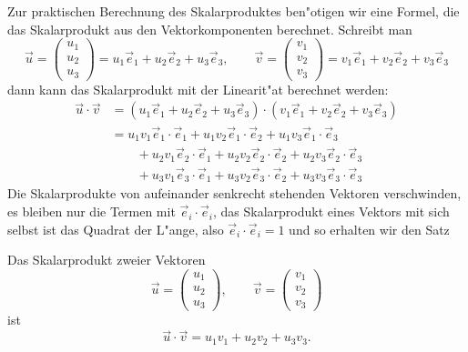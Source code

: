 Zur praktischen Berechnung des Skalarproduktes ben"otigen wir
eine Formel, die das Skalarprodukt aus den Vektorkomponenten 
berechnet. Schreibt man
\[
\vec u=\begin{pmatrix}u_1\\u_2\\u_3\end{pmatrix}
=u_1\vec e_1+u_2\vec e_2+u_3\vec e_3
,
\qquad
\vec v=\begin{pmatrix}v_1\\v_2\\v_3\end{pmatrix}
=v_1\vec e_1+v_2\vec e_2+v_3\vec e_3
\]
dann kann das Skalarprodukt mit der Linearit"at berechnet werden:
\begin{align*}
\vec u\cdot\vec v
&=
(u_1\vec e_1+u_2\vec e_2+u_3\vec e_3)\cdot
(v_1\vec e_1+v_2\vec e_2+v_3\vec e_3)
\\
&=
u_1v_1\vec e_1\cdot\vec e_1+
u_1v_2\vec e_1\cdot\vec e_2+
u_1v_3\vec e_1\cdot\vec e_3\\
&\qquad +
u_2v_1\vec e_2\cdot\vec e_1+
u_2v_2\vec e_2\cdot\vec e_2+
u_2v_3\vec e_2\cdot\vec e_3\\
&\qquad+
u_3v_1\vec e_3\cdot\vec e_1+
u_3v_2\vec e_3\cdot\vec e_2+
u_3v_3\vec e_3\cdot\vec e_3
\end{align*}
Die Skalarprodukte von aufeinander senkrecht stehenden Vektoren
verschwinden, es bleiben nur die Termen mit $\vec e_i\cdot\vec e_i$,
das Skalarprodukt eines Vektors mit sich selbst ist das Quadrat
der L"ange, also $\vec e_i\cdot \vec e_i=1$ und so erhalten wir den
Satz
\begin{satz}
Das Skalarprodukt zweier Vektoren 
\[
\vec u=\begin{pmatrix}u_1\\u_2\\u_3\end{pmatrix},
\qquad
\vec v=\begin{pmatrix}v_1\\v_2\\v_3\end{pmatrix}
\]
ist
\[
\vec u\cdot\vec v
=
u_1v_1+u_2v_2+u_3v_3.
\]
\end{satz}


